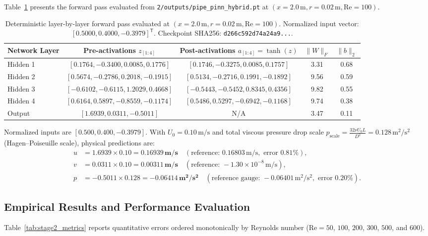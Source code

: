 \documentclass[11pt,a4paper]{article}
\begin{document}
Table~\ref{tab:stage2_act} presents the forward pass evaluated from \texttt{2/outputs/pipe\_pinn\_hybrid.pt} at $(x=2.0\,\text{m}, r=0.02\,\text{m}, \mathrm{Re}=100)$.
\begin{table}[H]
\centering
\small
\begin{tabular}{lcccc}
\toprule
\textbf{Network Layer} & \textbf{Pre-activations} $z_{[1:4]}$ & \textbf{Post-activations} $a_{[1:4]} = \tanh(z)$ & $\|W\|_F$ & $\|b\|_2$ \\
\midrule
Hidden 1 & $[0.1764, -0.3400, 0.0085, 0.1776]$ & $[0.1746, -0.3275, 0.0085, 0.1757]$ & 3.31 & 0.68 \\
Hidden 2 & $[0.5674, -0.2786, 0.2018, -0.1915]$ & $[0.5134, -0.2716, 0.1991, -0.1892]$ & 9.56 & 0.59 \\
Hidden 3 & $[-0.6102, -0.6115, 1.2029, 0.4668]$ & $[-0.5443, -0.5452, 0.8345, 0.4356]$ & 9.82 & 0.55 \\
Hidden 4 & $[0.6164, 0.5897, -0.8559, -0.1174]$ & $[0.5486, 0.5297, -0.6942, -0.1168]$ & 9.74 & 0.38 \\
Output & $[1.6939, 0.0311, -0.5011]$ & N/A & 3.47 & 0.11 \\
\bottomrule
\end{tabular}
\caption{Deterministic layer-by-layer forward pass evaluated at $(x=2.0\,\text{m}, r=0.02\,\text{m}, \mathrm{Re}=100)$. Normalized input vector: $[0.5000, 0.4000, -0.3979]^{\mathsf T}$. Checkpoint SHA256: \texttt{d266c592d74a24a9...}.}
\label{tab:stage2_act}
\end{table}
Normalized inputs are $[0.500, 0.400, -0.3979]$. With $U_0 = 0.10\,\text{m/s}$ and total viscous pressure drop scale $p_{\mathrm{scale}} = \frac{32 \nu U_0 L}{D^2} = 0.128\,\text{m}^2/\text{s}^2$ (Hagen--Poiseuille scale), physical predictions are:
\begin{align}
u &= 1.6939 \times 0.10 = \mathbf{0.16939\,\text{m/s}} \quad (\text{reference: } 0.16803\,\text{m/s}, \text{ error } 0.81\%), \\
v &= 0.0311 \times 0.10 = \mathbf{0.00311\,\text{m/s}} \quad (\text{reference: } -1.30\times 10^{-8}\,\text{m/s}), \\
p &= -0.5011 \times 0.128 = \mathbf{-0.06414\,\text{m}^2/\text{s}^2} \quad (\text{reference gauge: } -0.06401\,\text{m}^2/\text{s}^2, \text{ error } 0.20\%).
\end{align}

\subsection{Empirical Results and Performance Evaluation}
Table~\ref{tab:stage2_metrics} reports quantitative errors ordered monotonically by Reynolds number ($\mathrm{Re} = 50$, $100$, $200$, $300$, $500$, and $600$).

\end{document}
